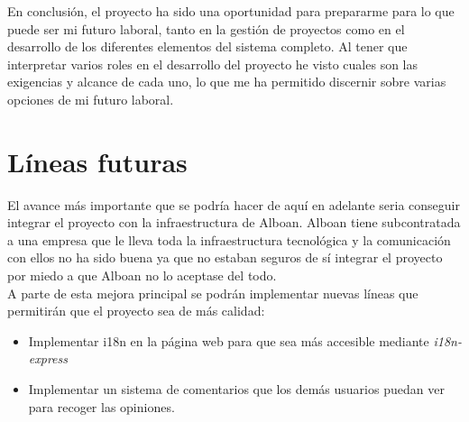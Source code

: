 En conclusión, el proyecto ha sido una oportunidad para prepararme para lo que puede ser mi futuro laboral, tanto en la gestión de proyectos como en el desarrollo de los diferentes elementos del sistema completo. Al tener que interpretar varios roles en el desarrollo del proyecto he visto cuales son las exigencias y alcance de cada uno, lo que me ha permitido discernir sobre varias opciones de mi futuro laboral.

\section{Líneas futuras}
El avance más importante que se podría hacer de aquí en adelante seria conseguir integrar el proyecto con la infraestructura de Alboan. Alboan tiene subcontratada a una empresa que le lleva toda la infraestructura tecnológica y la comunicación con ellos no ha sido buena ya que no estaban seguros de sí integrar el proyecto por miedo a que Alboan no lo aceptase del todo. \\

A parte de esta mejora principal se podrán implementar nuevas líneas que permitirán que el proyecto sea de más calidad:

\begin{itemize}
	\item Implementar i18n en la página web para que sea más accesible mediante \textit{i18n-express}
	\item Implementar un sistema de comentarios que los demás usuarios puedan ver para recoger las opiniones.
\end{itemize}
